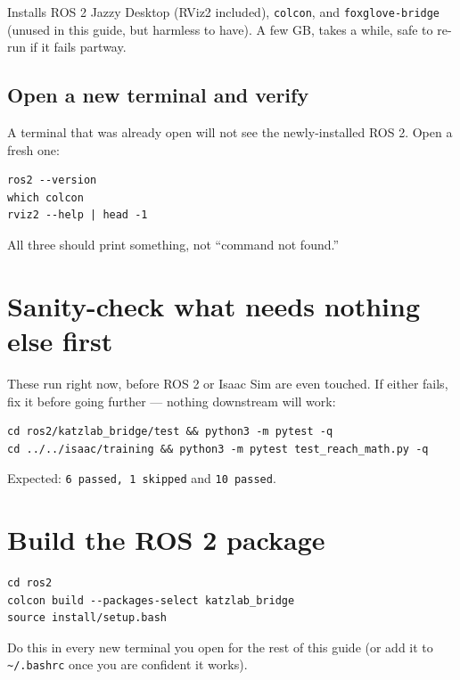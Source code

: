 \documentclass[11pt]{article}
\begin{document}
Installs ROS 2 Jazzy Desktop (RViz2 included), \texttt{colcon}, and
\texttt{foxglove-bridge} (unused in this guide, but harmless to have). A
few GB, takes a while, safe to re-run if it fails partway.

\subsection{Open a new terminal and verify}
A terminal that was already open will not see the newly-installed ROS 2.
Open a fresh one:

\begin{lstlisting}
ros2 --version
which colcon
rviz2 --help | head -1
\end{lstlisting}

All three should print something, not ``command not found.''

\section{Sanity-check what needs nothing else first}

These run right now, before ROS 2 or Isaac Sim are even touched. If
either fails, fix it before going further --- nothing downstream will
work:

\begin{lstlisting}
cd ros2/katzlab_bridge/test && python3 -m pytest -q
cd ../../isaac/training && python3 -m pytest test_reach_math.py -q
\end{lstlisting}

Expected: \texttt{6 passed, 1 skipped} and \texttt{10 passed}.

\section{Build the ROS 2 package}

\begin{lstlisting}
cd ros2
colcon build --packages-select katzlab_bridge
source install/setup.bash
\end{lstlisting}

Do this in every new terminal you open for the rest of this guide (or add
it to \texttt{\textasciitilde/.bashrc} once you are confident it works).
\end{document}
